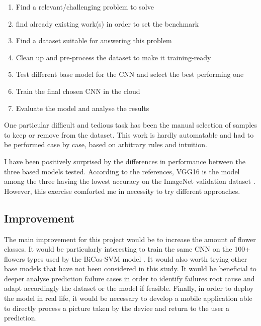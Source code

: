 \begin{enumerate}
	\setlength\itemsep{1pt}
	\setlength{\parskip}{0pt}
	\setlength{\parsep}{0pt}
	\item Find a relevant/challenging problem to solve
	\item find already existing work(s) in order to set the benchmark
	\item Find a dataset suitable for answering this problem
	\item Clean up and pre-process the dataset to make it training-ready
	\item Test different base model for the CNN and select the best performing one
	\item Train the final chosen CNN in the cloud
	\item Evaluate the model and analyse the results
\end{enumerate}

One particular difficult and tedious task has been the manual selection of samples to keep or remove from the dataset. This work is hardly automatable and had to be performed case by case, based on arbitrary rules and intuition. 

I have been positively surprised by the differences in performance between the three based models tested. According to the references, VGG16 is the model among the three having the lowest accuracy on the ImageNet validation dataset \cite{Keras_applications}. However, this exercise comforted me in necessity to try different approaches.  

\subsection{Improvement}

The main improvement for this project would be to increase the amount of flower classes. It would be particularly interesting to train the same CNN on the 100+ flowers types used by the BiCos-SVM model \cite{Chai_BiCos_demo}.
It would also worth trying other base models that have not been considered in this study.
It would be beneficial to deeper analyse prediction failure cases in order to identify failures root cause and adapt accordingly the dataset or the model if feasible.
Finally, in order to deploy the model in real life, it would be necessary to develop a mobile application able to directly process a picture taken by the device and return to the user a prediction.